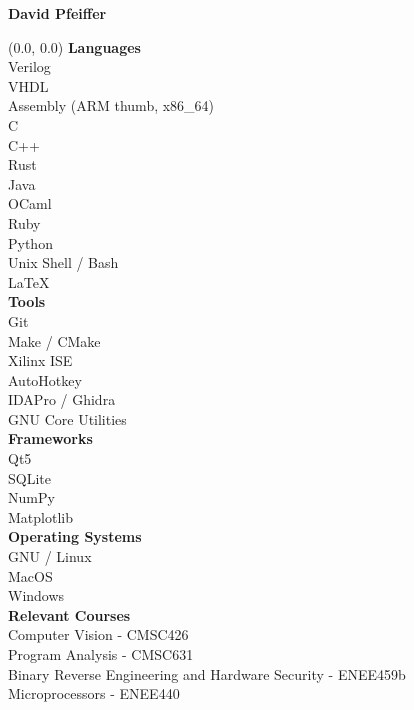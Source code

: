 \documentclass[10pt]{article}
\begin{document}

  \begin{center}
    \textbf{\Large David Pfeiffer} \\
  \end{center}

  \begin{textblock}{0.3}(0.0, 0.0)
    \textbf{Languages} \\
    Verilog \\
    VHDL \\
    Assembly (ARM thumb, x86_64) \\
    C \\
    C++ \\
    Rust \\
    Java \\
    OCaml \\
    Ruby \\
    Python \\
    Unix Shell / Bash \\
    LaTeX \\

    \textbf{Tools} \\
    Git \\
    Make / CMake \\
    Xilinx ISE \\
    AutoHotkey \\
    IDAPro / Ghidra \\
    GNU Core Utilities \\

    \textbf{Frameworks} \\
    Qt5 \\
    SQLite \\
    NumPy \\
    Matplotlib \\

    \textbf{Operating Systems} \\
    GNU / Linux \\
    MacOS \\
    Windows \\

    \textbf{Relevant Courses} \\
    Computer Vision - CMSC426 \\
    Program Analysis - CMSC631 \\
    Binary Reverse Engineering and Hardware Security - ENEE459b \\
    Microprocessors - ENEE440 \\


\end{textblock}
\end{document}
